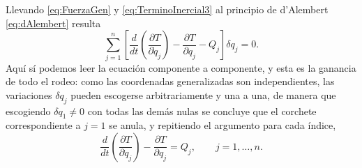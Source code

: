         Llevando \eqref{eq:FuerzaGen} y \eqref{eq:TerminoInercial3} al principio de d'Alembert \eqref{eq:dAlembert} resulta
        \begin{equation}\label{eq:dAlembertGen}
            \sum_{j=1}^{n}\left[\frac{d}{dt}\left(\frac{\partial T}{\partial\dot{q}_{j}}\right) - \frac{\partial T}{\partial q_{j}} - Q_{j}\right]\delta q_{j} = 0 .
        \end{equation}
        Aquí sí podemos leer la ecuación componente a componente, y esta es la ganancia de todo el rodeo: como las coordenadas generalizadas son independientes, las variaciones $\delta q_{j}$ pueden escogerse arbitrariamente y una a una, de manera que escogiendo $\delta q_{1}\neq 0$ con todas las demás nulas se concluye que el corchete correspondiente a $j=1$ se anula, y repitiendo el argumento para cada índice,
        \begin{equation}\label{eq:LagrangeT}
            \frac{d}{dt}\left(\frac{\partial T}{\partial\dot{q}_{j}}\right) - \frac{\partial T}{\partial q_{j}} = Q_{j}, \qquad j = 1,\ldots,n .
        \end{equation}

